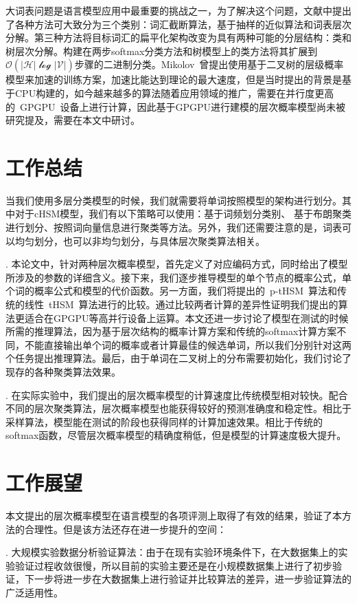 \summary
大词表问题是语言模型应用中最重要的挑战之一，为了解决这个问题，文献中提出了各种方法可大致分为三个类别：词汇截断算法，基于抽样的近似算法和词表层次分解。第三种方法将目标词汇的扁平化架构改变为具有两种可能的分层结构：类和树层次分解。构建在两步softmax分类方法和树模型上的类方法将其扩展到$\mathcal {O(| H | \log | V |)} $步骤的二进制分类。Mikolov~曾提出使用基于二叉树的层级概率模型来加速的训练方案，加速比能达到理论的最大速度，但是当时提出的背景是基于CPU构建的，如今越来越多的算法随着应用领域的推广，需要在并行度更高的~GPGPU~设备上进行计算，因此基于GPGPU进行建模的层次概率模型尚未被研究提及，需要在本文中研讨。
\section*{工作总结}
当我们使用多层分类模型的时候，我们就需要将单词按照模型的架构进行划分。其中对于cHSM模型，我们有以下策略可以使用：基于词频划分类别、 基于布朗聚类进行划分、按照词向量信息进行聚类等方法。另外，我们还需要注意的是，词表可以均匀划分，也可以非均匀划分，与具体层次聚类算法相关。


. 本论文中，针对两种层次概率模型，首先定义了对应编码方式，同时给出了模型所涉及的参数的详细含义。接下来，我们逐步推导模型的单个节点的概率公式，单个词的概率公式和模型的代价函数。另一方面，我们将提出的~p-tHSM~算法和传统的线性~tHSM~算法进行的比较。通过比较两者计算的差异性证明我们提出的算法更适合在GPGPU等高并行设备上运算。本文还进一步讨论了模型在测试的时候所需的推理算法，因为基于层次结构的概率计算方案和传统的softmax计算方案不同，不能直接输出单个词的概率或者计算最佳的候选单词，所以我们分别针对这两个任务提出推理算法。最后，由于单词在二叉树上的分布需要初始化，我们讨论了现存的各种聚类算法效果。

. 在实际实验中，我们提出的层次概率模型的计算速度比传统模型相对较快。配合不同的层次聚类算法，层次概率模型也能获得较好的预测准确度和稳定性。相比于采样算法，模型能在测试的阶段也获得同样的计算加速效果。相比于传统的softmax函数，尽管层次概率模型的精确度稍低，但是模型的计算速度极大提升。

\section*{工作展望}
本文提出的层次概率模型在语言模型的各项评测上取得了有效的结果，验证了本方法的合理性。但是该方法还存在进一步提升的空间：

. 大规模实验数据分析验证算法：由于在现有实验环境条件下，在大数据集上的实验验证过程收敛很慢，所以目前的实验主要还是在小规模数据集上进行了初步验证，下一步将进一步在大数据集上进行验证并比较算法的差异，进一步验证算法的广泛适用性。

